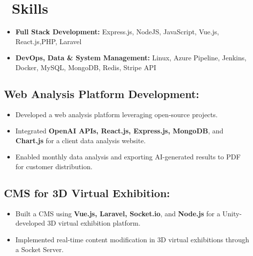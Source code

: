 \documentclass{resume}
\begin{document}



\section{\faCogs\ Skills}
\begin{itemize}[parsep=0.5ex]
  \item \textbf{Full Stack Development:} Express.js, NodeJS, JavaScript, Vue.js, React.js,PHP, Laravel
  \item \textbf{DevOps, Data \& System Management:} Linux, Azure Pipeline, Jenkins, Docker, MySQL, MongoDB, Redis, Stripe API
\end{itemize}


\subsection*{Web Analysis Platform Development:}
\begin{itemize}[noitemsep]
    \item Developed a web analysis platform leveraging open-source projects.
    \item Integrated \textbf{OpenAI APIs, React.js, Express.js, MongoDB}, and \textbf{Chart.js} for a client data analysis website.
    \item Enabled monthly data analysis and exporting AI-generated results to PDF for customer distribution.
\end{itemize}

\subsection*{CMS for 3D Virtual Exhibition:}
\begin{itemize}[noitemsep]
    \item Built a CMS using \textbf{Vue.js, Laravel, Socket.io}, and \textbf{Node.js} for a Unity-developed 3D virtual exhibition platform.
    \item Implemented real-time content modification in 3D virtual exhibitions through a Socket Server.
\end{itemize}
\end{document}
